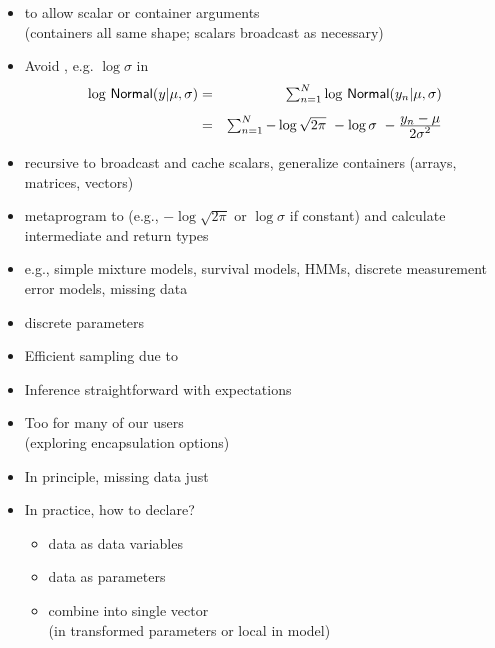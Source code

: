 \documentclass[10pt]{report}
\newcommand{\sld}[1]{\newpage{\noindent\LARGE \ \ \
    \textcolor{MidnightBlue}{\bfseries #1}}\vspace*{4pt}}
\newcommand{\myemph}[1]{{\color{MidnightBlue}{\bfseries #1}}}
\begin{document}
\sld{Coding Probability Functions}
\begin{itemize}
\item \myemph{Vectorized} to allow scalar or container arguments
  \\ {\footnotesize (containers all same shape; scalars broadcast as necessary)}
\item Avoid \myemph{repeated computations}, e.g. $\log \sigma$ in
  \hspace*{-18pt}
  {\small
    \begin{eqnarray*}
      \textstyle \log \, \mbox{\sf Normal}(y | \mu, \sigma)
      & = & \textstyle \sum_{n=1}^N \log \, \mbox{\sf Normal}(y_n | \mu,\sigma)
      \\[4pt]
      & = & \textstyle \sum_{n=1}^N  - \log \sqrt{2\pi} \ - \log \sigma \ -
      \frac{\textstyle y_n - \mu}{\textstyle 2\sigma^2}
    \end{eqnarray*}
  }
\item recursive \myemph{expression templates} to broadcast and cache scalars,
  generalize containers (arrays, matrices, vectors)
\item \myemph{traits} metaprogram to \myemph{drop constants} (e.g., $-\log
  \sqrt{2 \pi}$ or $\log \sigma$ if constant) 
  and calculate intermediate and return types
\end{itemize}

\sld{Models with Discrete Parameters}
\begin{itemize}
\item e.g., simple mixture models, survival models, HMMs,
  discrete measurement error models, missing data
\item \myemph{Marginalize out} discrete parameters
\item Efficient sampling due to \myemph{Rao-Blackwellization}
\item Inference straightforward with expectations
  \vspace*{12pt}
\item Too \myemph{difficult} for many of our users
  \\
  {\small (exploring encapsulation options)}
\end{itemize}

\sld{Models with Missing Data}
\begin{itemize}
\item In principle, missing data just \myemph{additional parameters}
\item In practice, how to declare? 
  \begin{itemize}
  \item \myemph{observed} data as data variables
  \item \myemph{missing} data as parameters
  \item combine into single vector 
    \\ {\footnotesize (in transformed parameters or local in model)}
  \end{itemize}
\end{itemize}
\end{document}
